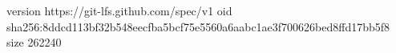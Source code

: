 version https://git-lfs.github.com/spec/v1
oid sha256:8ddcd113bf32b548eecfba5bcf75e5560a6aabc1ae3f700626bed8ffd17bb5f8
size 262240
